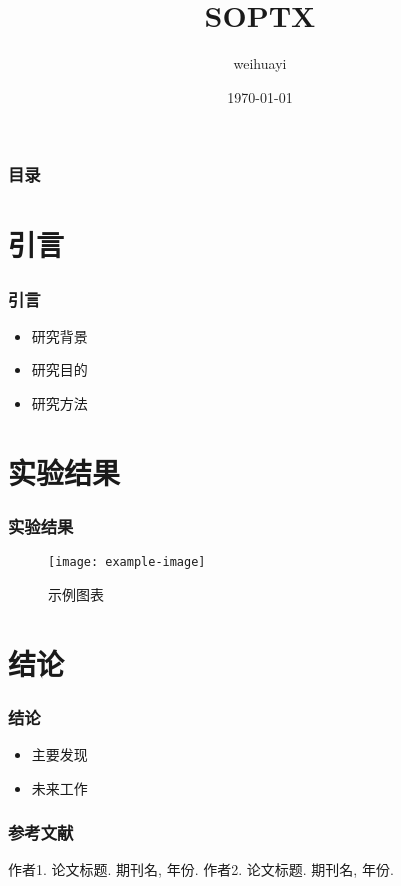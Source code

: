\documentclass{beamer}
\title{SOPTX}
\author{weihuayi}
\institute{xiangtan}
\date{\today}
\begin{document}
	
	\begin{frame}
		\titlepage
	\end{frame}
	
	\begin{frame}
		\frametitle{目录}
		\tableofcontents
	\end{frame}
	
	\section{引言}
	\begin{frame}
		\frametitle{引言}
		\begin{itemize}
			\item 研究背景
			\item 研究目的
			\item 研究方法
		\end{itemize}
	\end{frame}
	
	\section{实验结果}
	\begin{frame}
		\frametitle{实验结果}
		\begin{figure}
			\centering
			\texttt{[image: example-image]}
			\caption{示例图表}
		\end{figure}
	\end{frame}
	
	\section{结论}
	\begin{frame}
		\frametitle{结论}
		\begin{itemize}
			\item 主要发现
			\item 未来工作
		\end{itemize}
	\end{frame}
	
	\begin{frame}
		\frametitle{参考文献}
		\begin{thebibliography}{9}
			 作者1. 论文标题. 期刊名, 年份.
			 作者2. 论文标题. 期刊名, 年份.
		\end{thebibliography}
	\end{frame}
	
\end{document}
